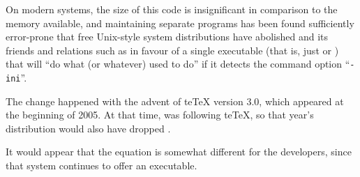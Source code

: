 On modern systems, the size of this code is insignificant in
comparison to the memory available, and maintaining separate programs
has been found sufficiently error-prone that free Unix-style system
distributions have abolished  and its friends and
relations such as  in favour of a single
executable (that is, just  or ) that
will ``do what  (or whatever) used to do'' if it
detects the command option ``\texttt{-ini}''.

The change happened with the advent of te\TeX{} version
3.0, which appeared at the beginning of 2005.  At that time,
\texlive{} was following te\TeX{}, so that year's \texlive{}
distribution would also have dropped .

It would appear that the equation is somewhat different for the
\miktex{} developers, since that system continues to offer an
 executable.
